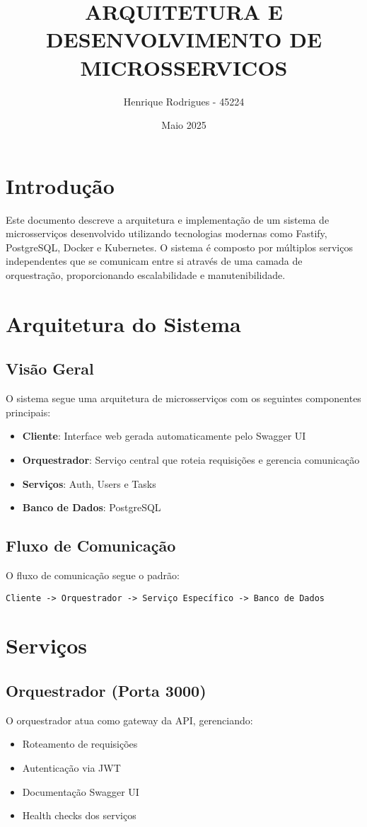 \documentclass{article}
\title{ARQUITETURA E DESENVOLVIMENTO DE MICROSSERVICOS}
\author{Henrique Rodrigues - 45224}
\date{Maio 2025}
\begin{document}
\maketitle

\section{Introdução}
Este documento descreve a arquitetura e implementação de um sistema de microsserviços desenvolvido utilizando tecnologias modernas como Fastify, PostgreSQL, Docker e Kubernetes. O sistema é composto por múltiplos serviços independentes que se comunicam entre si através de uma camada de orquestração, proporcionando escalabilidade e manutenibilidade.

\section{Arquitetura do Sistema}
\subsection{Visão Geral}
O sistema segue uma arquitetura de microsserviços com os seguintes componentes principais:
\begin{itemize}
    \item \textbf{Cliente}: Interface web gerada automaticamente pelo Swagger UI
    \item \textbf{Orquestrador}: Serviço central que roteia requisições e gerencia comunicação
    \item \textbf{Serviços}: Auth, Users e Tasks
    \item \textbf{Banco de Dados}: PostgreSQL
\end{itemize}

\subsection{Fluxo de Comunicação}
O fluxo de comunicação segue o padrão:
\begin{verbatim}
Cliente -> Orquestrador -> Serviço Específico -> Banco de Dados
\end{verbatim}

\section{Serviços}
\subsection{Orquestrador (Porta 3000)}
O orquestrador atua como gateway da API, gerenciando:
\begin{itemize}
    \item Roteamento de requisições
    \item Autenticação via JWT
    \item Documentação Swagger UI
    \item Health checks dos serviços
\end{itemize}
\end{document}
